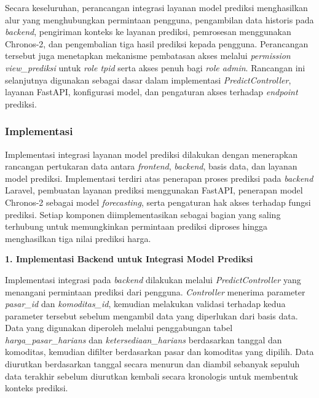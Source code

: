 Secara keseluruhan, perancangan integrasi layanan model prediksi menghasilkan alur yang menghubungkan permintaan pengguna, pengambilan data historis pada \textit{backend}, pengiriman konteks ke layanan prediksi, pemrosesan menggunakan Chronos-2, dan pengembalian tiga hasil prediksi kepada pengguna. Perancangan tersebut juga menetapkan mekanisme pembatasan akses melalui \textit{permission view\_prediksi} untuk \textit{role tpid} serta akses penuh bagi \textit{role admin}. Rancangan ini selanjutnya digunakan sebagai dasar dalam implementasi \textit{PredictController}, layanan FastAPI, konfigurasi model, dan pengaturan akses terhadap \textit{endpoint} prediksi.

\subsubsection{Implementasi}

Implementasi integrasi layanan model prediksi dilakukan dengan menerapkan rancangan pertukaran data antara \textit{frontend}, \textit{backend}, basis data, dan layanan model prediksi. Implementasi terdiri atas penerapan proses prediksi pada \textit{backend} Laravel, pembuatan layanan prediksi menggunakan FastAPI, penerapan model Chronos-2 sebagai model \textit{forecasting}, serta pengaturan hak akses terhadap fungsi prediksi. Setiap komponen diimplementasikan sebagai bagian yang saling terhubung untuk memungkinkan permintaan prediksi diproses hingga menghasilkan tiga nilai prediksi harga.

\vspace{0.5em}
\noindent\textbf{1. Implementasi Backend untuk Integrasi Model Prediksi}
\vspace{0.5em}

Implementasi integrasi pada \textit{backend} dilakukan melalui \textit{PredictController} yang menangani permintaan prediksi dari pengguna. \textit{Controller} menerima parameter \textit{pasar\_id} dan \textit{komoditas\_id}, kemudian melakukan validasi terhadap kedua parameter tersebut sebelum mengambil data yang diperlukan dari basis data. Data yang digunakan diperoleh melalui penggabungan tabel \textit{harga\allowbreak\_pasar\allowbreak\_harians} dan \textit{ketersediaan\allowbreak\_harians} berdasarkan tanggal dan komoditas, kemudian difilter berdasarkan pasar dan komoditas yang dipilih. Data diurutkan berdasarkan tanggal secara menurun dan diambil sebanyak sepuluh data terakhir sebelum diurutkan kembali secara kronologis untuk membentuk konteks prediksi.

